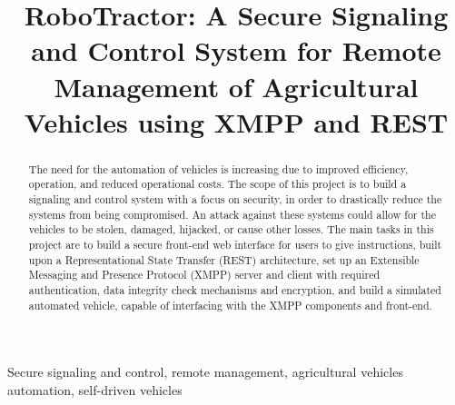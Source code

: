 \documentclass[conference,12pt]{IEEEtran}
\begin{document}
%
\title{RoboTractor: A Secure Signaling and Control System for Remote Management of Agricultural Vehicles using XMPP and REST}

\author{
\and
{}
\and
{}
}
\maketitle


\begin{abstract}
The need for the automation of vehicles is increasing due to
improved efficiency, operation, and reduced operational costs. The scope of this
project is to build a signaling and control system with
a focus on security, in order to drastically reduce the systems from being compromised.
An attack against these systems could allow for the vehicles to be stolen, damaged, hijacked, or cause other losses.
The main tasks in this project are to build a secure front-end
web interface for users to give instructions, built upon a Representational
State Transfer (REST) architecture, set up an Extensible Messaging and
Presence Protocol (XMPP) server and client with required
authentication, data integrity check mechanisms and encryption, and build a
simulated automated vehicle, capable of interfacing with the XMPP
components and front-end.
\end{abstract}

\begin{IEEEkeywords}
    Secure signaling and control, remote management, agricultural vehicles automation, self-driven vehicles
\end{IEEEkeywords}
\end{document}
